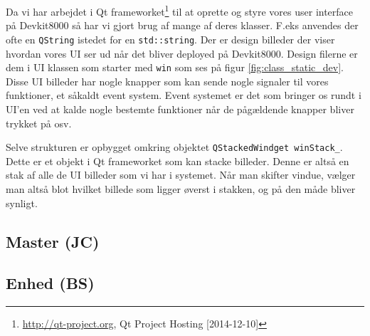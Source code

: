 Da vi har arbejdet i Qt frameworket\footnote{\url{http://qt-project.org}, Qt Project Hosting [2014-12-10]} til at oprette og styre vores user interface på Devkit8000 så har vi gjort brug af mange af deres klasser. F.eks anvendes der ofte en \verb+QString+ istedet for en \verb+std::string+. Der er design billeder der viser hvordan vores UI ser ud når det bliver deployed på Devkit8000. Design filerne er dem i UI klassen som starter med \verb+win+ som ses på figur \ref{fig:class_static_dev}. Disse UI billeder har nogle knapper som kan sende nogle signaler til vores funktioner, et såkaldt event system. Event systemet er det som bringer os rundt i UI'en ved at kalde nogle bestemte funktioner når de pågældende knapper bliver trykket på osv.

Selve strukturen er opbygget omkring objektet \verb+QStackedWindget winStack_+. Dette er et objekt i Qt frameworket som kan stacke billeder. Denne er altså en stak af alle de UI billeder som vi har i systemet. Når man skifter vindue, vælger man altså blot hvilket billede som ligger øverst i stakken, og på den måde bliver synligt. 

\subsection{Master (JC)}


\clearpage

\subsection{Enhed (BS)}


